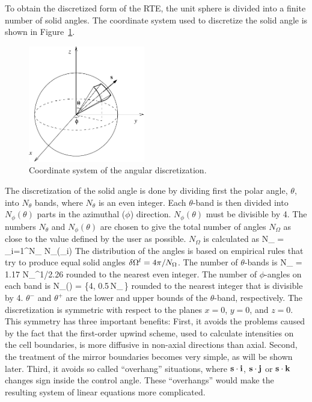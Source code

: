 To obtain the discretized form of the RTE, the unit sphere is divided into a finite number of solid angles.
The coordinate system used to discretize the solid angle is
shown in Figure~\ref{Angular}.
\begin{figure}[ht]
\begin{center}
\includegraphics[height=2in]{FIGURES/RadCoord}
\caption{Coordinate system of the angular discretization.}
\label{Angular}
\end{center}
\end{figure}
The discretization of the solid angle is done by dividing first
the polar angle, $\theta$, into $N_{\theta}$ bands, where
$N_{\theta}$ is an even integer.
Each $\theta$-band is then divided into
$N_{\phi}(\theta)$ parts in the azimuthal ($\phi$) direction.
$N_{\phi}(\theta)$ must be divisible by 4.
The numbers $N_{\theta}$ and $N_{\phi}(\theta)$ are chosen
to give the total number of angles $N_{\Omega}$ as close to
the value defined by the user as possible.
$N_{\Omega}$ is calculated as
\be
 N_{\Omega} = \sum_{i=1}^{N_{\theta}} N_{\phi}(\theta_i)
\ee
The distribution of the angles is based on empirical rules that try
to produce equal solid angles $\delta {\Omega}^l = 4\pi/N_{\Omega}$. The
number of $\theta$-bands is
\be
 N_{\theta} = 1.17 \; N_{\Omega}^{1/2.26}
\ee
rounded to the nearest even integer. The number of $\phi$-angles
on each band is
\be
 N_{\phi}(\theta) = \max\left\{4,
        0.5\,N_{\Omega}\,\left[\cos(\theta^-)-\cos(\theta^+)\right]\right\}
\ee
rounded to the nearest integer that is divisible by 4.
$\theta^-$ and $\theta^+$ are
the lower and upper bounds of the $\theta$-band, respectively.
The discretization is symmetric with respect to the planes $x=0$, $y=0$, and
$z=0$. This symmetry has three important benefits:
First, it avoids the problems caused by the fact that the first-order
upwind scheme, used to calculate intensities on the cell boundaries,
is more diffusive in non-axial directions than axial.
Second, the treatment of the mirror boundaries becomes very simple, as
will be shown later. Third,
it avoids so called
``overhang'' situations, where ${\mathbf{s}}\cdot {\bf i}$, ${\mathbf{s}}\cdot {\bf j}$
or ${\mathbf{s}}\cdot {\bf k}$ changes sign inside
the control angle. These ``overhangs'' would make the resulting system of
linear equations more complicated.

